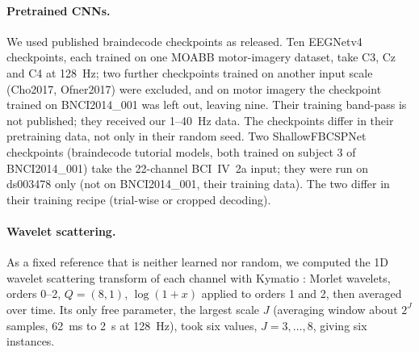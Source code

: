 \documentclass[11pt]{article}
\begin{document}
\paragraph{Pretrained CNNs.} We used published braindecode checkpoints as released. Ten
EEGNetv4 checkpoints, each trained on one MOABB motor-imagery dataset, take C3, Cz and C4 at
128~Hz; two further checkpoints trained on another input scale (Cho2017, Ofner2017) were
excluded, and on motor imagery the checkpoint trained on BNCI2014\_001 was left out, leaving
nine. Their training band-pass is not published; they received our 1--40~Hz data. The checkpoints
differ in their pretraining data, not only in their random seed. Two
ShallowFBCSPNet checkpoints (braindecode tutorial models, both trained on subject 3 of
BNCI2014\_001) take the 22-channel BCI~IV~2a input; they were run on ds003478 only (not on BNCI2014\_001, their training data). The two differ in
their training recipe (trial-wise or cropped decoding).

\paragraph{Wavelet scattering.} As a fixed reference that is neither learned nor random, we
computed the 1D wavelet scattering transform \citep{mallat2012, anden2014} of each channel with
Kymatio \citep{andreux2020}: Morlet wavelets, orders 0--2, $Q = (8, 1)$, $\log(1 + x)$ applied to
orders 1 and 2, then averaged over time. Its only free parameter, the largest scale $J$
(averaging window about $2^J$ samples, 62~ms to 2~s at 128~Hz), took six values, $J = 3, \dots, 8$,
giving six instances.
\end{document}
